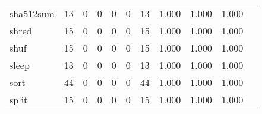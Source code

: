 \begin{longtable}{lp{1.20cm}p{1.20cm}p{1.20cm}p{1.20cm}p{1.20cm}p{1.20cm}p{1.20cm}p{1.20cm}p{1.20cm}p{1.20cm}}
sha512sum &                                    13 &                                                  0 &                                                  0 &                                                  0 &                                                  0 &                                                 13 &                                         1.000 &                                              1.000 &                                              1.000 \\
shred     &                                    15 &                                                  0 &                                                  0 &                                                  0 &                                                  0 &                                                 15 &                                         1.000 &                                              1.000 &                                              1.000 \\
shuf      &                                    15 &                                                  0 &                                                  0 &                                                  0 &                                                  0 &                                                 15 &                                         1.000 &                                              1.000 &                                              1.000 \\
sleep     &                                    13 &                                                  0 &                                                  0 &                                                  0 &                                                  0 &                                                 13 &                                         1.000 &                                              1.000 &                                              1.000 \\
sort      &                                    44 &                                                  0 &                                                  0 &                                                  0 &                                                  0 &                                                 44 &                                         1.000 &                                              1.000 &                                              1.000 \\
split     &                                    15 &                                                  0 &                                                  0 &                                                  0 &                                                  0 &                                                 15 &                                         1.000 &                                              1.000 &                                              1.000 \\

\end{longtable}
